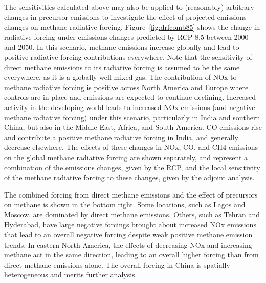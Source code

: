 The sensitivities calculated above may also be applied to (reasonably) arbitrary changes in precursor emissions to investigate the effect of projected emissions changes on methane radiative forcing. Figure~\ref{fig:drfcomb85} shows the change in radiative forcing under emissions changes predicted by RCP 8.5 between 2000 and 2050. In this scenario, methane emissions increase globally and lead to positive radiative forcing contributions everywhere. Note that the sensitivity of direct methane emissions to its radiative forcing is assumed to be the same everywhere, as it is a globally well-mixed gas. The contribution of NOx to methane radiative forcing is positive across North America and Europe where controls are in place and emissions are expected to continue declining. Increased activity in the developing world leads to increased NOx emissions (and negative methane radiative forcing) under this scenario, particularly in India and southern China, but also in the Middle East, Africa, and South America. CO emissions rise and contribute a positive methane radiative forcing in India, and generally decrease elsewhere. The effects of these changes in NOx, CO, and CH4 emissions on the global methane radiative forcing are shown separately, and represent a combination of the emissions changes, given by the RCP, and the local sensitivity of the methane radiative forcing to these changes, given by the adjoint analysis. 


The combined forcing from direct methane emissions and the effect of precursors on methane is shown in the bottom right. Some locations, such as Lagos and Moscow, are dominated by direct methane emissions. Others, such as Tehran and Hyderabad, have large negative forcings brought about increased NOx emissions that lead to an overall negative forcing despite weak positive methane emission trends. In eastern North America, the effects of decreasing NOx and increasing methane act in the same direction, leading to an overall higher forcing than from direct methane emissions alone. The overall forcing in China is spatially heterogeneous and merits further analysis.

